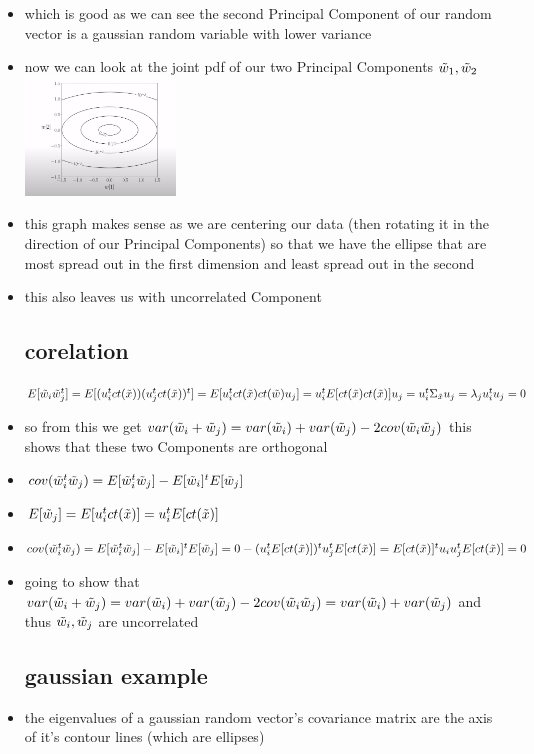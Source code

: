 \documentclass{article}
\begin{document}
\begin{itemize}
\item which is good as we can see the second Principal Component of our random vector is a gaussian random variable with lower variance
\item now we can look at the joint pdf of our two Principal Components $\Tilde{w}_1, \Tilde{w}_2$ \\  \includegraphics*[width=4cm]{notes/week_8/vedio_2/immages/v2_8.png}
\item this graph makes sense as we are centering our data (then rotating it in the direction of our Principal Components) so that we have the ellipse that are most spread out in the first dimension and least spread out in the second 
\item this also leaves us with uncorrelated Component
\subsection*{corelation}
$E[\Tilde{w}_{i}\Tilde{w}_{j}^t]=E[(u_i^{t}ct(\Tilde{x}))(u_j^{t}ct(\Tilde{x}))^{t}]=E[u_i^{t}ct(\Tilde{x})ct(\Tilde{w})u_j]=u_i^{t}E[ct(\Tilde{x})ct(\Tilde{x})]u_j=u_i^{t}\Sigma_{\Tilde{x}}u_{j}=\lambda_{j}u_i^{t}u_{j}=0$
\item so from this we get $var(\tilde{w}_{i}+\tilde{w}_{j})=var(\Tilde{w}_{i})+var(\Tilde{w}_{j})-2cov(\Tilde{w}_{i}\tilde{w}_{j})$ this shows that these two Components are orthogonal
\item $cov(\Tilde{w}_{i}^{t}\Tilde{w}_{j})=E[\Tilde{w}_{i}^{t}\Tilde{w}_{j}]-E[\Tilde{w}_{i}]^{t}E[\Tilde{w}_{j}]$
\item $E[\Tilde{w}_{j}]=E[u_{i}^{t}ct(\Tilde{x})]=u_i^{t}E[ct(\Tilde{x})]$
\item $cov(\Tilde{w}_{i}^{t}\Tilde{w}_{j})=E[\Tilde{w}_{i}^{t}\Tilde{w}_{j}]-E[\Tilde{w}_{i}]^{t}E[\Tilde{w}_{j}]=0-(u_i^{t}E[ct(\Tilde{x})])^{t}u_j^{t}E[ct(\Tilde{x})]=E[ct(\Tilde{x})]^{t}u_iu_j^{t}E[ct(\Tilde{x})]=0$
\item going to show that $var(\tilde{w}_{i}+\tilde{w}_{j})=var(\Tilde{w}_{i})+var(\Tilde{w}_{j})-2cov(\Tilde{w}_{i}\tilde{w}_{j})=var(\Tilde{w}_{i})+var(\Tilde{w}_{j})$ and thus $\Tilde{w}_{i}, \Tilde{w}_{j}$ are uncorrelated
\subsection*{gaussian example}
\item the eigenvalues of a gaussian random vector's covariance matrix are the axis of it's contour lines (which are ellipses)

\end{itemize}
\end{document}
